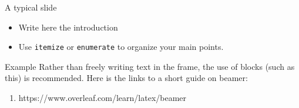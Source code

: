 \documentclass[aspectratio=169]{beamer}
\begin{document}
	\begin{frame}{A typical slide}
		
		
		\begin{itemize}
			\item Write here the introduction
			\item Use \texttt{itemize} or \texttt{enumerate} to organize your main points.
		\end{itemize}
				
		\begin{block}{Example}
			Rather than freely writing text in the frame, the use of blocks (such as this) is recommended.
			Here is the links to a short guide on beamer:
			\begin{enumerate}
				\item https://www.overleaf.com/learn/latex/beamer
			\end{enumerate}
		\end{block}
		
	\end{frame}	
	
\end{document}
